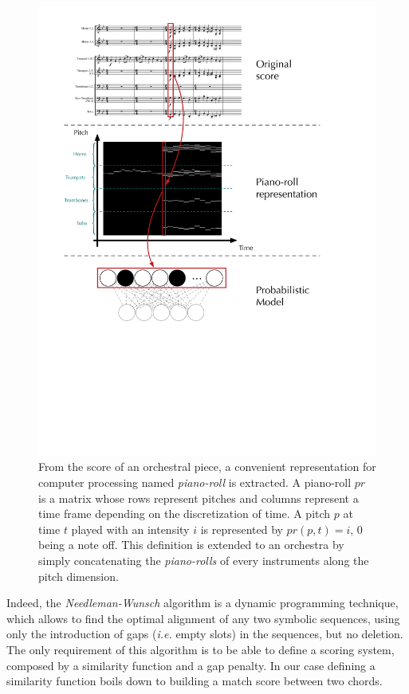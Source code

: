 \documentclass[twoside,twocolumn]{article}
\begin{document}
\begin{figure}[ht]
\centering
\includegraphics[scale=0.35]{data_representation}
\caption{From the score of an orchestral piece, a convenient representation for computer processing named \textit{piano-roll} is extracted. A piano-roll $pr$ is a matrix whose rows represent pitches and columns represent a time frame depending on the discretization of time. A pitch $p$ at time $t$ played with an intensity $i$ is represented by $pr(p,t) = i$, $0$ being a note off. This definition is extended to an orchestra by simply concatenating the \textit{piano-rolls} of every instruments along the pitch dimension.}
\label{fig:pianoroll}
\end{figure}

Indeed, the \textit{Needleman-Wunsch}  algorithm \cite{NEEDLEMAN1970443} is a dynamic programming technique, which allows to find the optimal alignment of any two symbolic sequences, using only the introduction of gaps (\textit{i.e.} empty slots) in the sequences, but no deletion.
The only requirement of this algorithm is to be able to define a scoring system, composed by a similarity function and a gap penalty. In our case defining a similarity function boils down to building a match score between two chords.
\end{document}
